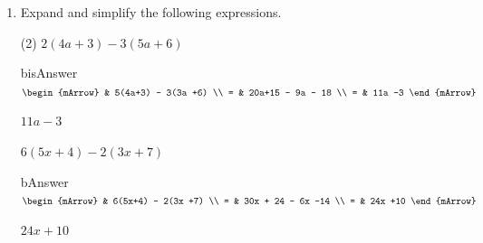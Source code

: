 \begin{enumerate}[resume]	
  \item Expand and simplify the following expressions.
  \begin{subtask}(2)
    \task[]  $ 2(4a+3) - 3(5a +6)  $
              \begin{envOut}[height=6cm]{bisAnswer}
			       $\begin{mArrow}
			                & 5(4a+3) - 3(3a +6)       \\ 
			              = & 20a+15 - 9a - 18       \\ 
                          = & 11a -3   
	                \end{mArrow}$
              \end{envOut}			  
			  \begin{exercise}\begin{shortsolution}  
				       $11a -3$
			  \end{shortsolution}\end{exercise}
			  
    \task[]  $ 6(5x+4) - 2(3x +7)  $
              \begin{envOut}[height=6cm]{bAnswer}
			       $\begin{mArrow}
			                & 6(5x+4) - 2(3x +7)      \\ 
			              = & 30x + 24 - 6x -14      \\
			              = & 24x +10  
	                \end{mArrow}$
              \end{envOut}			  
			  \begin{exercise}\begin{shortsolution}  
				       $24x +10$
			  \end{shortsolution}\end{exercise}			  
    \end{subtask}
\end{enumerate}




